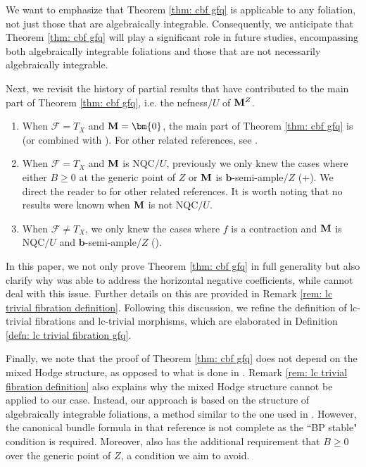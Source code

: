 \documentclass[11pt]{amsart}
\numberwithin{equation}{section}
\newcommand{\bb}{\bm{b}}
\newcommand{\Mm}{{\bf{M}}}
\newcommand{\Ff}{\mathcal{F}}
\theoremstyle{definition}
\theoremstyle{definition}
\theoremstyle{definition}
\begin{document}
We want to emphasize that Theorem \ref{thm: cbf gfq} is applicable to any foliation, not just those that are algebraically integrable. Consequently, we anticipate that Theorem \ref{thm: cbf gfq} will play a significant role in future studies, encompassing both algebraically integrable foliations and those that are not necessarily algebraically integrable.

Next, we revisit the history of partial results that have contributed to the main part of Theorem \ref{thm: cbf gfq}, i.e. the nefness$/U$ of $\Mm^Z$. 
\begin{enumerate}
    \item When $\Ff=T_X$ and $\Mm=\bm{0}$, the main part of Theorem \ref{thm: cbf gfq} is\cite[Theorem 1.2]{JLX22} (or \cite[Theorem 2.23]{JLX22} combined with \cite[Lemma 1.1]{FG12}). For other related references, see \cite{Kod64,Kaw98,Amb05,Kol07,Flo14,FG14}.
    \item When $\Ff=T_X$ and $\Mm$ is NQC$/U$, previously we only knew the cases where either $B\geq 0$ at the generic point of $Z$ or $\Mm$ is $\bb$-semi-ample$/Z$ (\cite[Theorem 2.23]{JLX22}+\cite[Theorem 4.5]{HL21b}). We direct the reader to \cite{Fil19,Fil20,FS23} for other related references. It is worth noting that no results were known when $\Mm$ is not NQC$/U$.
    \item When $\Ff \neq T_X$, we only knew the cases where $f$ is a contraction and $\Mm$ is NQC$/U$ and $\bb$-semi-ample$/Z$ (\cite[Proposition 6.14]{LLM23}).
\end{enumerate}
In this paper, we not only prove Theorem \ref{thm: cbf gfq} in full generality but also clarify why \cite{Kol07} was able to address the horizontal negative coefficients, while \cite{Fil19,Fil20,JLX22,FS23} cannot deal with this issue. Further details on this are provided in Remark \ref{rem: lc trivial fibration definition}. Following this discussion, we refine the definition of lc-trivial fibrations and lc-trivial morphisms, which are elaborated in Definition \ref{defn: lc trivial fibration gfq}.

Finally, we note that the proof of Theorem \ref{thm: cbf gfq} does not depend on the mixed Hodge structure, as opposed to what is done in \cite{Kol07}. Remark \ref{rem: lc trivial fibration definition} also explains why the mixed Hodge structure cannot be applied to our case. Instead, our approach is based on the structure of algebraically integrable foliations, a method similar to the one used in \cite[Proof of Theorem 1.3]{ACSS21}. However, the canonical bundle formula in that reference is not complete as the ``BP stable" condition is required. Moreover, \cite[Theorem 1.3]{ACSS21} also has the additional requirement that $B\geq 0$ over the generic point of $Z$, a condition we aim to avoid.
\end{document}

